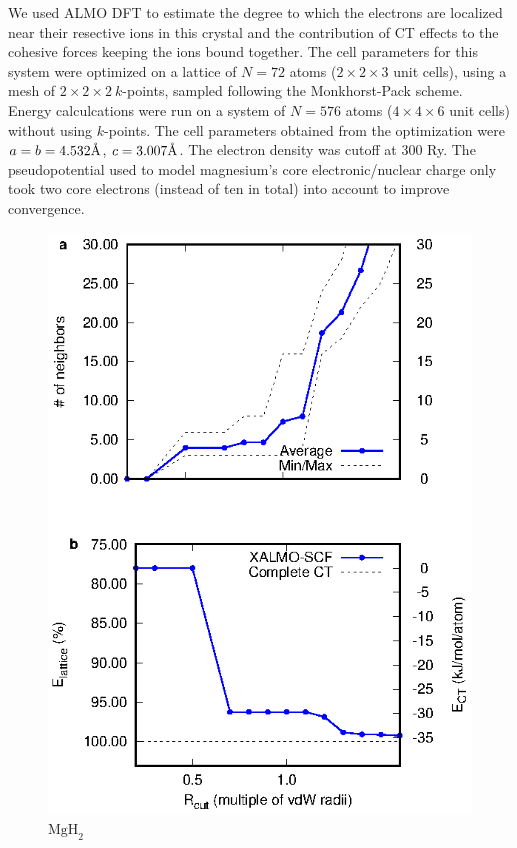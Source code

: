 \documentclass[aps,prb,twocolumn,amsmath,amssymb,superscriptaddress,longbibliography]{revtex4-1}
\newcommand{\angstrom}{\text{\normalfont\AA}}
\begin{document}
We used ALMO DFT to estimate the degree to which the electrons are localized near their resective ions in this crystal and the contribution of CT effects to the cohesive forces keeping the ions bound together.    
The cell parameters for this system were optimized on a lattice of $N = 72$ atoms ($2\times 2\times 3$ unit cells), using a mesh of $2\times 2\times 2\: k$-points, sampled following the Monkhorst-Pack scheme\cite{kpts}.\\ 
Energy calculcations were run on a system of $N = 576$ atoms ($4\times 4\times 6$ unit cells) without using $k$-points.
The cell parameters obtained from the optimization were $a = b = 4.532\angstrom$, $c = 3.007\angstrom$.
The electron density was cutoff at 300 Ry. 
The pseudopotential used to model magnesium's core electronic/nuclear charge only took two core electrons (instead of ten in total) into account to improve convergence.
 
\begin{figure}
\includegraphics[scale=1]{plots/MgH2_EvR}
\caption{$\text{MgH}_{2}$}
\end{figure}
\end{document}
